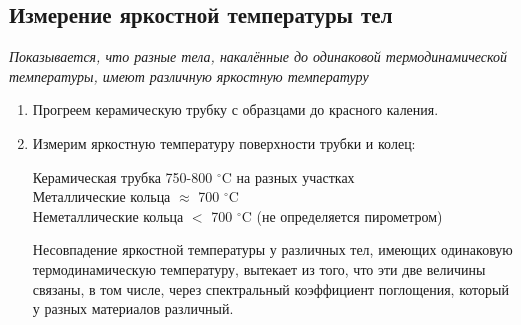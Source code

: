 \documentclass[a4paper]{article}
\begin{document}
\subsection{Измерение яркостной температуры тел}
\textit{Показывается, что разные тела, накалённые до одинаковой термодинамической температуры, имеют различную яркостную температуру}
\begin{enumerate}
    \item Прогреем керамическую трубку с образцами до красного каления.
    \item Измерим яркостную температуру поверхности трубки и колец:
    \begin{center}
        Керамическая трубка \hspace{1cm} 750-800 $^{\circ}$C на разных участках \\
        Металлические кольца \hspace{1cm} $\approx$ 700 $^{\circ}$C \\
        Неметаллические кольца \hspace{1cm} $<$ 700 $^{\circ}$C (не определяется пирометром)
    \end{center}
Несовпадение яркостной температуры у различных тел, имеющих одинаковую термодинамическую температуру, вытекает из того, что эти две величины связаны, в том числе, через спектральный коэффициент поглощения, который у разных материалов различный.
\end{enumerate}
\end{document}
